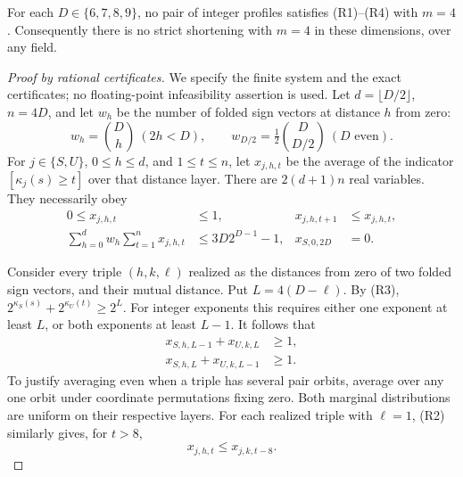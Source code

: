 \begin{proposition}
\label{prop:width-four-finite-certificates}
For each $D\in\{6,7,8,9\}$, no pair of integer profiles
satisfies (R1)--(R4) with $m=4$.  Consequently there is
no strict shortening with $m=4$ in these dimensions,
over any field.
\end{proposition}
\begin{proof}[Proof by rational certificates]
We specify the finite system and the exact certificates;
no floating-point infeasibility assertion is used.
Let $d=\lfloor D/2\rfloor$, $n=4D$, and let
$w_h$ be the number of folded sign vectors at distance $h$
from zero:
\[
 w_h=\binom Dh\ (2h<D),\qquad
 w_{D/2}=\tfrac12\binom D{D/2}\ (D\text{ even}).
\]
For $j\in\{S,U\}$, $0\le h\le d$, and $1\le t\le n$,
let $x_{j,h,t}$ be the average of the indicator
$[\kappa_j(s)\ge t]$ over that distance layer.
There are $2(d+1)n$ real variables.  They necessarily obey
\begin{align}
 0\le x_{j,h,t}&\le1,&
 x_{j,h,t+1}&\le x_{j,h,t},                         \tag{R8}\\
 \sum_{h=0}^d w_h\sum_{t=1}^n x_{j,h,t}
 &\le3D2^{D-1}-1,&x_{S,0,2D}&=0.                  \tag{R9}
\end{align}

Consider every triple $(h,k,\ell)$ realized as the distances
from zero of two folded sign vectors, and their mutual
distance.  Put $L=4(D-\ell)$.
By (R3), $2^{\kappa_S(s)}+2^{\kappa_U(t)}\ge2^L$.
For integer exponents this requires either one exponent
at least $L$, or both exponents at least $L-1$.
It follows that
\begin{align}
 x_{S,h,L-1}+x_{U,k,L}&\ge1,\\
 x_{S,h,L}+x_{U,k,L-1}&\ge1.                       \tag{R10}
\end{align}
To justify averaging even when a triple has several pair
orbits, average over any one orbit under coordinate
permutations fixing zero.  Both marginal distributions
are uniform on their respective layers.
For each realized triple with $\ell=1$, (R2) similarly
gives, for $t>8$,
\[
 x_{j,h,t}\le x_{j,k,t-8}.                         \tag{R11}
\]


\end{proof}
